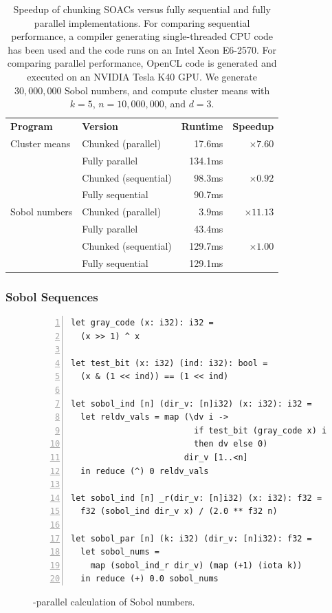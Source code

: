 \begin{table}
  \centering
  \begin{tabular}{llrr}
    \textbf{Program} & \textbf{Version}  & \textbf{Runtime} & \textbf{Speedup} \\
\multirow{4}{*}{Cluster means} & Chunked (parallel) & 17.6ms & \multirow{2}{*}{$\times7.60$} \\
& Fully parallel & 134.1ms & \\\cline{2-4}
& Chunked (sequential) & 98.3ms & \multirow{2}{*}{$\times0.92$} \\
& Fully sequential & 90.7ms & \\\hline

\multirow{4}{*}{Sobol numbers} & Chunked (parallel) & 3.9ms & \multirow{2}{*}{$\times11.13$} \\
& Fully parallel & 43.4ms & \\\cline{2-4}
& Chunked (sequential) & 129.7ms & \multirow{2}{*}{$\times1.00$} \\
& Fully sequential & 129.1ms & \\
  \end{tabular}
  \caption{Speedup of chunking SOACs versus fully sequential and
    fully parallel implementations.  For comparing sequential
    performance, a compiler generating single-threaded CPU code has
    been used and the code runs on an Intel Xeon E6-2570.  For
    comparing parallel performance, OpenCL code is generated and
    executed on an NVIDIA Tesla K40 GPU.  We generate $30,000,000$
    Sobol numbers, and compute cluster means with
    $k=5$, $n=10,000,000$, and $d=3$.}
  \label{tab:streaming-perf}
\end{table}

\subsubsection{Sobol Sequences}
\label{sec:sobolsequences}

\begin{figure}
\begin{lstlisting}[numbers=left]
let gray_code (x: i32): i32 =
  (x >> 1) ^ x

let test_bit (x: i32) (ind: i32): bool =
  (x & (1 << ind)) == (1 << ind)

let sobol_ind [n] (dir_v: [n]i32) (x: i32): i32 =
  let reldv_vals = map (\dv i ->
                         if test_bit (gray_code x) i
                         then dv else 0)
                       dir_v [1..<n]
  in reduce (^) 0 reldv_vals

let sobol_ind [n] _r(dir_v: [n]i32) (x: i32): f32 =
  f32 (sobol_ind dir_v x) / (2.0 ** f32 n)

let sobol_par [n] (k: i32) (dir_v: [n]i32): f32 =
  let sobol_nums =
    map (sobol_ind_r dir_v) (map (+1) (iota k))
  in reduce (+) 0.0 sobol_nums
\end{lstlisting}
\caption{-parallel calculation of Sobol numbers.}
\label{fig:parallel-sobol}
\end{figure}

